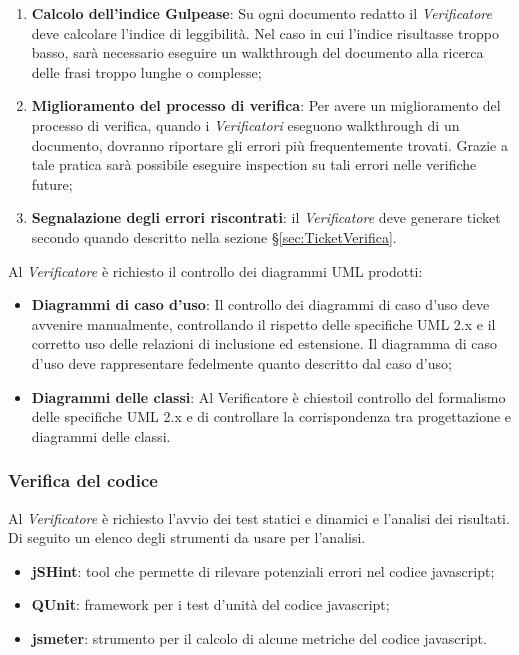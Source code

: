 {\begin{enumerate}
	\item \textbf{Calcolo dell’indice Gulpease}: Su ogni documento redatto il \emph{Verificatore} deve calcolare l’indice di leggibilità. Nel caso in cui l’indice risultasse troppo basso, sarà necessario eseguire un walkthrough del documento alla ricerca delle frasi troppo lunghe o complesse;
	\item \textbf{Miglioramento del processo di verifica}: Per avere un miglioramento del processo di verifica, quando i \emph{Verificatori} eseguono walkthrough di un documento, dovranno riportare gli errori più frequentemente trovati. Grazie a tale pratica sarà possibile eseguire inspection su tali errori nelle verifiche future;
	\item \textbf{Segnalazione degli errori riscontrati}: il \emph{Verificatore} deve generare ticket secondo quando descritto nella
	sezione \S\ref{sec:TicketVerifica}.
	\end{enumerate}
	\label{sec:strumentiVerifica}
Al \emph{Verificatore} è richiesto il controllo dei diagrammi UML prodotti:
\begin{itemize}

\item \textbf{Diagrammi di caso d’uso}: Il controllo dei diagrammi di caso d’uso deve avvenire manualmente, controllando il rispetto delle specifiche UML 2.x e il corretto uso delle relazioni di inclusione ed estensione. Il diagramma di caso d’uso deve rappresentare fedelmente quanto descritto dal caso d’uso;
\item \textbf{Diagrammi delle classi}: Al Verificatore è chiestoil controllo del formalismo delle specifiche UML 2.x e di controllare la corrispondenza tra progettazione e diagrammi delle classi.

\end{itemize}

	\subsubsection{Verifica del codice}
	Al \emph{Verificatore} è richiesto l’avvio dei test statici e dinamici e l’analisi dei risultati. Di seguito un elenco degli strumenti da usare per l’analisi.
	
	\label{sec:analisiStatica}
	  \begin{itemize}
	  \item \textbf{jSHint}: tool che permette di rilevare potenziali errori nel codice javascript;
	  \item \textbf{QUnit}: framework per i test d'unità del codice javascript;
	  \item \textbf{jsmeter}: strumento per il calcolo di alcune metriche del codice javascript.
	  \end{itemize}
	
}

